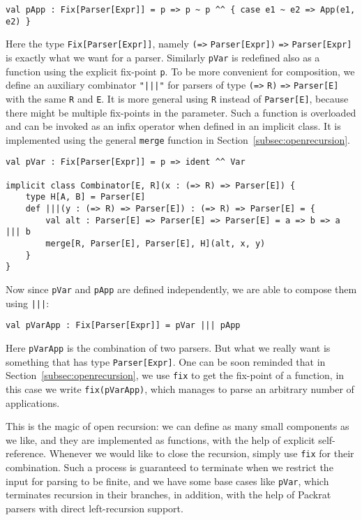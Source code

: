 \begin{lstlisting}
val pApp : Fix[Parser[Expr]] = p => p ~ p ^^ { case e1 ~ e2 => App(e1, e2) }
\end{lstlisting}
Here the type \lstinline{Fix[Parser[Expr]]}, namely \lstinline{(=>} \lstinline{Parser[Expr])} \lstinline{=>} \lstinline{Parser[Expr]} is exactly what we want for a parser. Similarly \lstinline{pVar} is redefined also as a function using the explicit fix-point \lstinline{p}. To be more convenient for composition, we define an auxiliary combinator \lstinline{"|||"} for parsers of type \lstinline{(=>} \lstinline{R)} \lstinline{=>} \lstinline{Parser[E]} with the same \lstinline{R} and \lstinline{E}. It is more general using \lstinline{R} instead of \lstinline{Parser[E]}, because there might be multiple fix-points in the parameter. Such a function is overloaded and can be invoked as an infix operator when defined in an implicit class. It is implemented using the general \lstinline{merge} function in Section~\ref{subsec:openrecursion}.
\begin{lstlisting}
val pVar : Fix[Parser[Expr]] = p => ident ^^ Var

implicit class Combinator[E, R](x : (=> R) => Parser[E]) {
    type H[A, B] = Parser[E]
    def |||(y : (=> R) => Parser[E]) : (=> R) => Parser[E] = {
        val alt : Parser[E] => Parser[E] => Parser[E] = a => b => a ||| b
        merge[R, Parser[E], Parser[E], H](alt, x, y)
    }
}
\end{lstlisting}
Now since \lstinline{pVar} and \lstinline{pApp} are defined independently, we are able to compose them using \lstinline{|||}:
\begin{lstlisting}
val pVarApp : Fix[Parser[Expr]] = pVar ||| pApp
\end{lstlisting}
Here \lstinline{pVarApp} is the combination of two parsers. But what we really want is something that has type \lstinline{Parser[Expr]}. One can be soon reminded that in Section~\ref{subsec:openrecursion}, we use \lstinline{fix} to get the fix-point of a function, in this case we write \lstinline{fix(pVarApp)}, which manages to parse an arbitrary number of applications.

This is the magic of open recursion: we can define as many small components as we like, and they are implemented as functions, with the help of explicit self-reference. Whenever we would like to close the recursion, simply use \lstinline{fix} for their combination. Such a process is guaranteed to terminate when we restrict the input for parsing to be finite, and we have some base cases like \lstinline{pVar}, which terminates recursion in their branches, in addition, with the help of Packrat parsers with direct left-recursion support.

